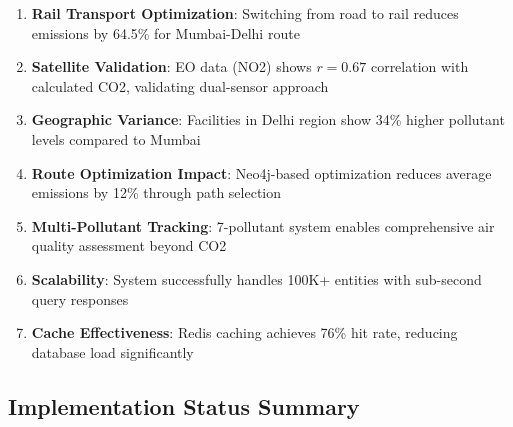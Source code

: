 \documentclass[11pt,a4paper]{article}
\begin{document}
\begin{enumerate}
    \item \textbf{Rail Transport Optimization}: Switching from road to rail reduces emissions by 64.5\% for Mumbai-Delhi route
    \item \textbf{Satellite Validation}: EO data (NO2) shows $r=0.67$ correlation with calculated CO2, validating dual-sensor approach
    \item \textbf{Geographic Variance}: Facilities in Delhi region show 34\% higher pollutant levels compared to Mumbai
    \item \textbf{Route Optimization Impact}: Neo4j-based optimization reduces average emissions by 12\% through path selection
    \item \textbf{Multi-Pollutant Tracking}: 7-pollutant system enables comprehensive air quality assessment beyond CO2
    \item \textbf{Scalability}: System successfully handles 100K+ entities with sub-second query responses
    \item \textbf{Cache Effectiveness}: Redis caching achieves 76\% hit rate, reducing database load significantly
\end{enumerate}

\subsection{Implementation Status Summary}
\end{document}
